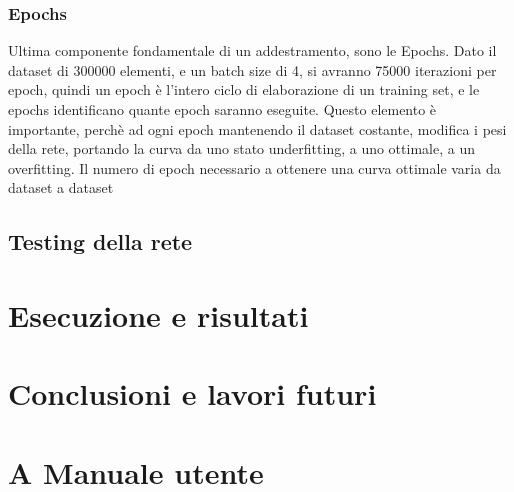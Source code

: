 \documentclass[14pt]{extarticle}
\begin{document}
\subsubsection{Epochs}
Ultima componente fondamentale di un addestramento, sono le Epochs.
Dato il dataset di 300000 elementi, e un batch size di 4, si avranno 75000 iterazioni per epoch, quindi un epoch è l'intero ciclo di elaborazione di un training set, e le epochs identificano quante epoch saranno eseguite. Questo elemento è importante, perchè ad ogni epoch mantenendo il dataset costante, modifica i pesi della rete, portando la curva da uno stato underfitting, a uno ottimale, a un overfitting. 
Il numero di epoch necessario a ottenere una curva ottimale varia da dataset a dataset
\subsection{Testing della rete}

\section{Esecuzione e risultati}

\section{Conclusioni e lavori futuri}

\section{A Manuale utente}

\newpage
\printbibliography
\end{document}
